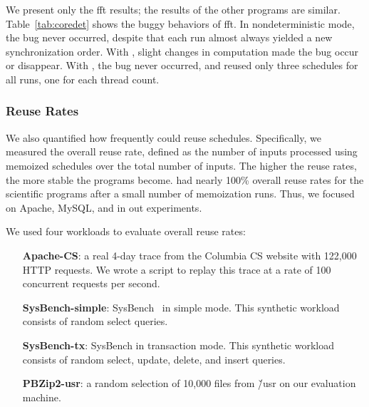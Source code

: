 We present only the fft results; the results of the other programs are
similar.  Table~\ref{tab:coredet} shows the buggy behaviors of fft.
  In nondeterministic mode, the bug never
occurred, despite that each run almost always yielded a new
synchronization order. With \coredet, slight changes in computation made the
bug occur or disappear.  With \tern, the bug never occurred, and
\tern reused only three schedules for all runs, one for each
thread count.  



\subsubsection{Reuse Rates} \label{sec:tern-reuse-rate}

We also quantified how frequently \tern could reuse schedules.
Specifically, we measured the overall reuse rate, defined as the number of
inputs processed using memoized schedules over the total number of inputs.
The higher the reuse rates, the more stable the programs become.  \tern had
nearly 100\% overall reuse rates for the scientific programs after a small
number of memoization runs.  Thus, we focused on Apache, MySQL, and \pbzip
in out experiments.

We used four workloads to evaluate overall reuse rates:

\begin{enumerate}

\item[{\bf Apache-CS}:] a real 4-day trace from the Columbia CS website
  with 122,000 HTTP requests.  We wrote a script to replay this trace at a
  rate of 100 concurrent requests per second.

\item[{\bf SysBench-simple}:] SysBench~\cite{sysbench} in simple mode.  This
  synthetic workload consists of random select queries.


\item[{\bf SysBench-tx}:] SysBench in transaction mode.  This synthetic
  workload consists of random select, update, delete, and insert queries.

\item[{\bf PBZip2-usr}:] a random selection of 10,000 files from \v{/usr}
  on our evaluation machine.

\end{enumerate}

